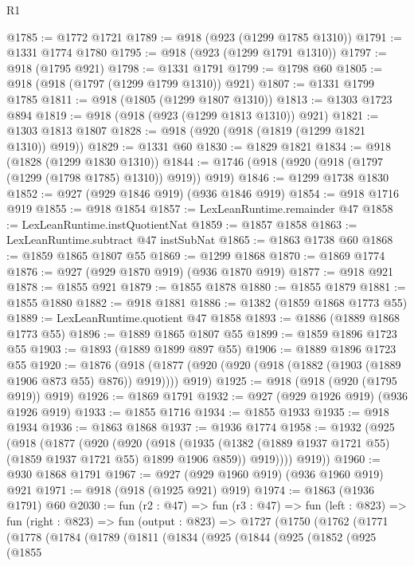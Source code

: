 \begin{lexlean}{R1}
\begin{coremodule}
@1785 := @1772 @1721
@1789 := @918 (@923 (@1299 @1785 @1310))
@1791 := @1331 @1774 @1780
@1795 := @918 (@923 (@1299 @1791 @1310))
@1797 := @918 (@1795 @921)
@1798 := @1331 @1791
@1799 := @1798 @60
@1805 := @918 (@918 (@1797 (@1299 @1799 @1310)) @921)
@1807 := @1331 @1799 @1785
@1811 := @918 (@1805 (@1299 @1807 @1310))
@1813 := @1303 @1723 @894
@1819 := @918 (@918 (@923 (@1299 @1813 @1310)) @921)
@1821 := @1303 @1813 @1807
@1828 := @918 (@920 (@918 (@1819 (@1299 @1821 @1310)) @919))
@1829 := @1331 @60
@1830 := @1829 @1821
@1834 := @918 (@1828 (@1299 @1830 @1310))
@1844 := @1746 (@918 (@920 (@918 (@1797 (@1299 (@1798 @1785) @1310)) @919)) @919)
@1846 := @1299 @1738 @1830
@1852 := @927 (@929 @1846 @919) (@936 @1846 @919)
@1854 := @918 @1716 @919
@1855 := @918 @1854
@1857 := LexLeanRuntime.remainder @47
@1858 := LexLeanRuntime.instQuotientNat
@1859 := @1857 @1858
@1863 := LexLeanRuntime.subtract @47 instSubNat
@1865 := @1863 @1738 @60
@1868 := @1859 @1865 @1807 @55
@1869 := @1299 @1868
@1870 := @1869 @1774
@1876 := @927 (@929 @1870 @919) (@936 @1870 @919)
@1877 := @918 @921
@1878 := @1855 @921
@1879 := @1855 @1878
@1880 := @1855 @1879
@1881 := @1855 @1880
@1882 := @918 @1881
@1886 := @1382 (@1859 @1868 @1773 @55)
@1889 := LexLeanRuntime.quotient @47 @1858
@1893 := @1886 (@1889 @1868 @1773 @55)
@1896 := @1889 @1865 @1807 @55
@1899 := @1859 @1896 @1723 @55
@1903 := @1893 (@1889 @1899 @897 @55)
@1906 := @1889 @1896 @1723 @55
@1920 := @1876
    (@918 (@1877 (@920 (@920 (@918 (@1882 (@1903 (@1889 @1906 @873 @55) @876)) @919)))) @919)
@1925 := @918 (@918 (@920 (@1795 @919)) @919)
@1926 := @1869 @1791
@1932 := @927 (@929 @1926 @919) (@936 @1926 @919)
@1933 := @1855 @1716
@1934 := @1855 @1933
@1935 := @918 @1934
@1936 := @1863 @1868
@1937 := @1936 @1774
@1958 := @1932
    (@925
      (@918
        (@1877
          (@920
            (@920
              (@918
                (@1935 (@1382 (@1889 @1937 @1721 @55) (@1859 @1937 @1721 @55) @1899 @1906 @859))
                @919))))
        @919))
@1960 := @930 @1868 @1791
@1967 := @927 (@929 @1960 @919) (@936 @1960 @919) @921
@1971 := @918 (@918 (@1925 @921) @919)
@1974 := @1863 (@1936 @1791) @60
@2030 := fun (r2 : @47) =>
  fun (r3 : @47) =>
  fun (left : @823) =>
  fun (right : @823) =>
  fun (output : @823) =>
  @1727
    (@1750
      (@1762
        (@1771
          (@1778
            (@1784
              (@1789
                (@1811
                  (@1834
                    (@925
                      (@1844
                        (@925
                          (@1852
                            (@925
                              (@1855

\end{coremodule}
\end{lexlean}
